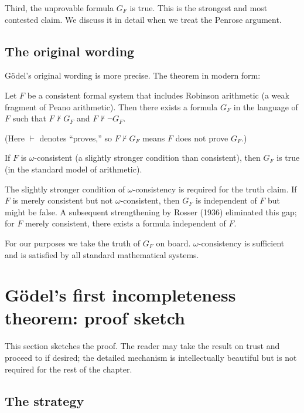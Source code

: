 Third, the unprovable formula $G_F$ is true. This is the strongest
and most contested claim. We discuss it in detail when we treat the
Penrose argument.

\subsection{The original wording}

G\"odel's original wording is more precise. The theorem in modern
form:

\begin{theorem}
\label{thm:godel-1}
Let $F$ be a consistent formal system that includes Robinson
arithmetic (a weak fragment of Peano arithmetic). Then there exists
a formula $G_F$ in the language of $F$ such that $F \nvdash G_F$
and $F \nvdash \neg G_F$.

(Here $\vdash$ denotes ``proves,'' so $F \nvdash G_F$ means $F$ does
not prove $G_F$.)

If $F$ is $\omega$-consistent (a slightly stronger condition than
consistent), then $G_F$ is true (in the standard model of arithmetic).
\end{theorem}

The slightly stronger condition of $\omega$-consistency is required
for the truth claim. If $F$ is merely consistent but not
$\omega$-consistent, then $G_F$ is independent of $F$ but might be
false. A subsequent strengthening by Rosser (1936) eliminated this
gap; for $F$ merely consistent, there exists a formula independent
of $F$.

For our purposes we take the truth of $G_F$ on board.
$\omega$-consistency is sufficient and is satisfied by all standard
mathematical systems.

\section{G\"odel's first incompleteness theorem: proof sketch}
\label{sec:godel-proof}

This section sketches the proof. The reader may take the result on
trust and proceed to  if desired; the
detailed mechanism is intellectually beautiful but is not required
for the rest of the chapter.

\subsection{The strategy}

